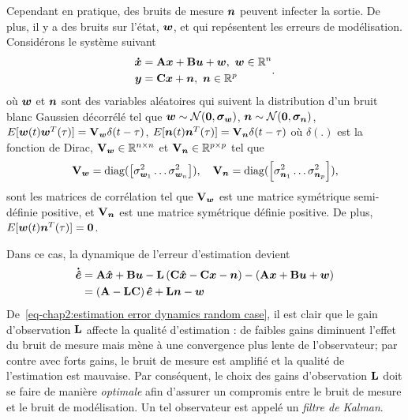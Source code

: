 Cependant en pratique, des bruits de mesure $\bm{n}$ peuvent infecter la sortie. De plus, il y a des bruits  sur l'état, $\bm{w}$,  et  qui repésentent les erreurs de modélisation. Considérons le système suivant
\begin{align}\label{eq-chap2:syslin_commande_noise}
	\begin{split}
		\stateDot &= \matriceA\state+\matriceB\command+\modelNoise, \ \modelNoise\inR^n\\
		\out &= \matriceC\state + \measureNoise, \ \measureNoise\inR^{p}
	\end{split}.
\end{align}
où $\bm{w}$ et $\bm{n}$ sont des variables aléatoires qui suivent la distribution d'un bruit blanc Gaussien décorrélé tel que $\bm{w}\sim{\cal N}(\mathbf{0},\boldsymbol{\sigma}_{\bm{w}})$, $\bm{n}\sim{\cal N}(\mathbf{0},\boldsymbol{\sigma}_{\bm{n}})$, $E[\bm{w}(t)\bm{w}^T(\tau)]=\mathbf{V}_{\bm w}\delta(t-\tau)$, $E[\bm{n}(t)\bm{n}^T(\tau)]=\mathbf{V}_{\bm n}\delta(t-\tau)$ où $\delta(.)$ est la fonction de Dirac,  $\mathbf{V}_{\bm w}\in \mathbb{R}^{n\times n}$ et $\mathbf{V}_{\bm n}\in \mathbb{R}^{p\times p}$ tel que 
\begin{equation}
\mathbf{V}_{\bm w} = \operatorname{diag}(\left[\sigma^2_{{\bm{w}}_1}\ldots\sigma^2_{{\bm{w}}_n}\right]), \quad \mathbf{V}_{\bm n} = \operatorname{diag}(\left[\sigma^2_{{\bm{n}}_1}\ldots\sigma^2_{{\bm{n}}_p}\right]),
\end{equation}sont les matrices de corrélation tel que $\mathbf{V}_{\bm w}$ est une matrice symétrique semi-définie positive, et $\mathbf{V}_{\bm n}$ est une matrice symétrique définie positive. De plus, $E[\bm{w}(t)\bm{n}^T(\tau)]=\mathbf{0}$.

Dans ce cas, la dynamique de l'erreur d'estimation devient
\begin{align}\label{eq-chap2:estimation error dynamics random case}
	\begin{split}
		\bm{\dot{\hat{e}}} &=  \mathbf{A}\bm{\hat{x}}+\mathbf{B}\bm{u}-\mathbf{L}\left(\mathbf{C}\bm{\hat{x}}-\mathbf{C}\bm{x}-\bm{n}\right) - \left(\mathbf{A}\bm{x}+\mathbf{B}\bm{u}+\bm{w}\right)\\
		&=\left(\mathbf{A}-\mathbf{L}\mathbf{C}\right)\bm{\hat{e}} + \mathbf{L}\bm{n}-\bm{w}
	\end{split}
\end{align}
De~\eqref{eq-chap2:estimation error dynamics random case}, il est clair que le gain d'observation $\mathbf{L}$ affecte la qualité d'estimation : de faibles gains diminuent l'effet du bruit de mesure mais mène à une convergence  plus lente de l'observateur; par contre avec forts gains, le bruit de mesure est amplifié et la qualité de l'estimation est mauvaise. 
Par conséquent, le choix des gains d'observation $\mathbf{L}$ doit se faire de manière \emph{optimale} afin d'assurer un compromis entre le bruit de mesure et le bruit de modélisation. Un tel observateur est appelé  un \emph{filtre de Kalman}. 


